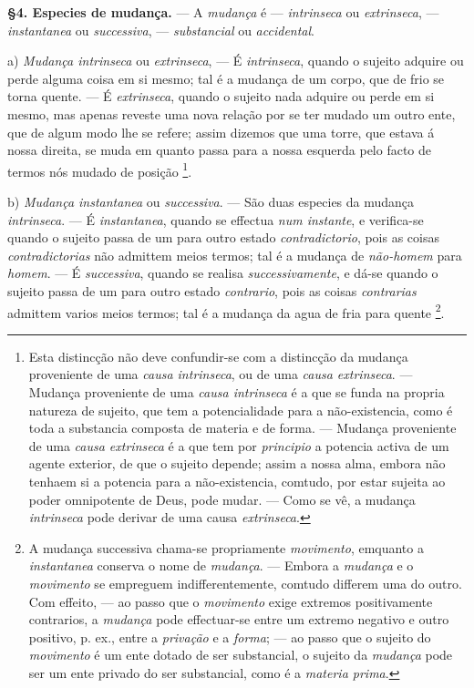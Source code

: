 \textbf{§4. Especies de mudança.} --- A \emph{mudança} é --- \emph{intrinseca} ou \emph{extrinseca}, --- \emph{instantanea} ou \emph{successiva}, --- \emph{substancial} ou \emph{accidental}.

a) \emph{Mudança intrinseca} ou \emph{extrinseca}, --- É \emph{intrinseca}, quando o sujeito adquire ou perde alguma coisa em si mesmo; tal é a mudança de um corpo, que de frio se torna quente. --- É \emph{extrinseca}, quando o sujeito nada adquire ou perde em si mesmo, mas apenas reveste uma nova relação por se ter mudado um outro ente, que de algum modo lhe se refere; assim dizemos que uma torre, que estava á nossa direita, se muda em quanto passa para a nossa esquerda pelo facto de termos nós mudado de posição \footnote{Esta distincção não deve confundir-se com a distincção da mudança proveniente de uma \emph{causa intrinseca}, ou de uma \emph{causa extrinseca}. --- Mudança proveniente de uma \emph{causa intrinseca} é a que se funda na propria natureza de sujeito, que tem a potencialidade para a não-existencia, como é toda a substancia composta de materia e de forma. --- Mudança proveniente de uma \emph{causa extrinseca} é a que tem por \emph{principio} a potencia activa de um agente exterior, de que o sujeito depende; assim a nossa alma, embora não tenhaem si a potencia para a não-existencia, comtudo, por estar sujeita ao poder omnipotente de Deus, pode mudar. --- Como se vê, a mudança \emph{intrinseca} pode derivar de uma causa \emph{extrinseca}.}.

 b) \emph{Mudança instantanea} ou \emph{successiva}. --- São duas especies da mudança \emph{intrinseca}. --- É \emph{instantanea}, quando se effectua \emph{num instante}, e verifica-se quando o sujeito passa de um para outro estado \emph{contradictorio}, pois as coisas \emph{contradictorias} não admittem meios termos; tal é a mudança de \emph{não-homem} para \emph{homem}. --- É \emph{successiva}, quando se realisa \emph{successivamente}, e dá-se quando o sujeito passa de um para outro estado \emph{contrario}, pois as coisas \emph{contrarias} admittem varios meios termos; tal é a mudança da agua de fria para quente \footnote{A mudança successiva chama-se propriamente \emph{movimento}, emquanto a \emph{instantanea} conserva o nome de \emph{mudança}. --- Embora a \emph{mudança} e o \emph{movimento} se empreguem indifferentemente, comtudo differem uma do outro. Com effeito, --- ao passo que o \emph{movimento} exige extremos positivamente contrarios, a \emph{mudança} pode effectuar-se entre um extremo negativo e outro positivo, p. ex., entre a \emph{privação} e a \emph{forma}; --- ao passo que o sujeito do \emph{movimento} é um ente dotado de ser substancial, o sujeito da \emph{mudança} pode ser um ente privado do ser substancial, como é a \emph{materia prima}.}.

